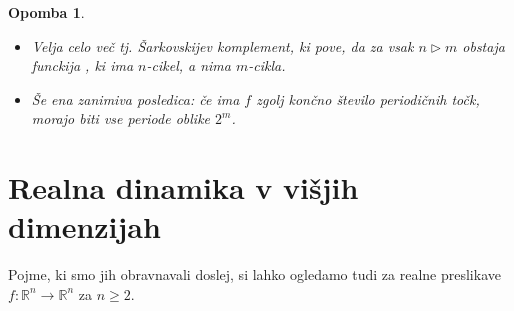\documentclass{article}
\newtheorem{opomba}{Opomba}
\newcommand{\R}{\mathbb{R}}
\begin{document}
\begin{opomba}
\hfill
\begin{itemize}
    \item Velja celo več tj. Šarkovskijev komplement, ki pove, da za 
    vsak $n \triangleright m$ obstaja funckija , ki ima $n$-cikel, a 
    nima $m$-cikla.
    \item Še ena zanimiva posledica: če ima $f$ zgolj končno število 
    periodičnih točk, morajo biti vse periode oblike $2^m$.
\end{itemize}
\end{opomba}

\section{Realna dinamika v višjih dimenzijah}

Pojme, ki smo jih obravnavali doslej, si lahko ogledamo tudi za 
realne preslikave $f: \R^n \rightarrow \R^n$ za $n \geq 2$.
\end{document}
